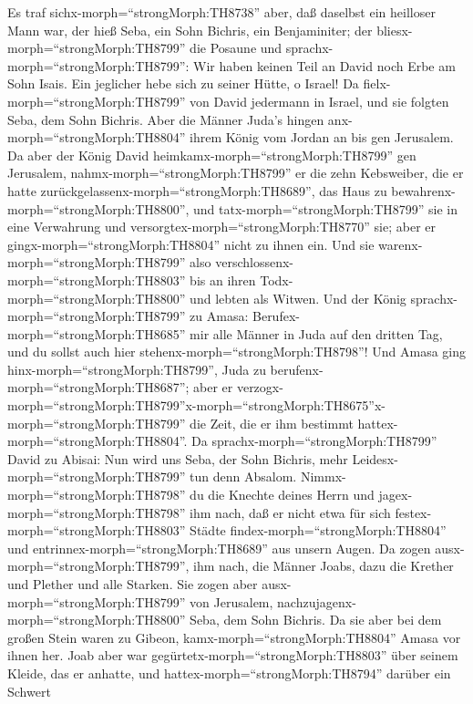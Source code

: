  Es traf sichx-morph=``strongMorph:TH8738'' aber, daß
daselbst ein heilloser Mann war, der hieß Seba, ein Sohn Bichris, ein
Benjaminiter; der bliesx-morph=``strongMorph:TH8799'' die Posaune und
sprachx-morph=``strongMorph:TH8799'': Wir haben keinen Teil an David
noch Erbe am Sohn Isais. Ein jeglicher hebe sich zu seiner Hütte, o
Israel!  Da fielx-morph=``strongMorph:TH8799'' von David
jedermann in Israel, und sie folgten Seba, dem Sohn Bichris. Aber die
Männer Juda's hingen anx-morph=``strongMorph:TH8804'' ihrem König vom
Jordan an bis gen Jerusalem.  Da aber der König David
heimkamx-morph=``strongMorph:TH8799'' gen Jerusalem,
nahmx-morph=``strongMorph:TH8799'' er die zehn Kebsweiber, die er hatte
zurückgelassenx-morph=``strongMorph:TH8689'', das Haus zu
bewahrenx-morph=``strongMorph:TH8800'', und
tatx-morph=``strongMorph:TH8799'' sie in eine Verwahrung und
versorgtex-morph=``strongMorph:TH8770'' sie; aber er
gingx-morph=``strongMorph:TH8804'' nicht zu ihnen ein. Und sie
warenx-morph=``strongMorph:TH8799'' also
verschlossenx-morph=``strongMorph:TH8803'' bis an ihren
Todx-morph=``strongMorph:TH8800'' und lebten als Witwen. 
Und der König sprachx-morph=``strongMorph:TH8799'' zu Amasa:
Berufex-morph=``strongMorph:TH8685'' mir alle Männer in Juda auf den
dritten Tag, und du sollst auch hier
stehenx-morph=``strongMorph:TH8798''!  Und Amasa ging
hinx-morph=``strongMorph:TH8799'', Juda zu
berufenx-morph=``strongMorph:TH8687''; aber er
verzogx-morph=``strongMorph:TH8799''\textbar x-morph=``strongMorph:TH8675''x-morph=``strongMorph:TH8799''
die Zeit, die er ihm bestimmt hattex-morph=``strongMorph:TH8804''.
 Da sprachx-morph=``strongMorph:TH8799'' David zu Abisai:
Nun wird uns Seba, der Sohn Bichris, mehr
Leidesx-morph=``strongMorph:TH8799'' tun denn Absalom.
Nimmx-morph=``strongMorph:TH8798'' du die Knechte deines Herrn und
jagex-morph=``strongMorph:TH8798'' ihm nach, daß er nicht etwa für sich
festex-morph=``strongMorph:TH8803'' Städte
findex-morph=``strongMorph:TH8804'' und
entrinnex-morph=``strongMorph:TH8689'' aus unsern Augen.  Da
zogen ausx-morph=``strongMorph:TH8799'', ihm nach, die Männer Joabs,
dazu die Krether und Plether und alle Starken. Sie zogen aber
ausx-morph=``strongMorph:TH8799'' von Jerusalem,
nachzujagenx-morph=``strongMorph:TH8800'' Seba, dem Sohn Bichris.
 Da sie aber bei dem großen Stein waren zu Gibeon,
kamx-morph=``strongMorph:TH8804'' Amasa vor ihnen her. Joab aber war
gegürtetx-morph=``strongMorph:TH8803'' über seinem Kleide, das er
anhatte, und hattex-morph=``strongMorph:TH8794'' darüber ein Schwert
